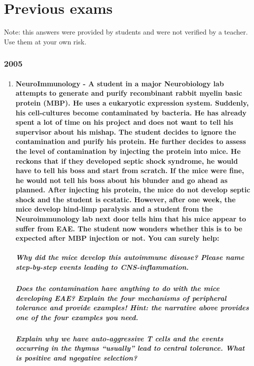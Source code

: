 \documentclass[12pt,article,oneside,a4paper]{memoir}
\begin{document}
\section{Previous exams}

Note: this answers were provided by students and were not verified by a teacher. Use them at your own risk.

\subsubsection{2005}
\begin{enumerate}
\item \paragraph{NeuroImmunology - A student in a major Neurobiology lab attempts to generate and purify recombinant rabbit myelin basic protein (MBP).  He uses a eukaryotic expression system.  Suddenly, his cell-cultures become contaminated by bacteria.  He has already spent a lot of time on his project and does not want to tell his supervisor about his mishap.  The student decides to ignore the contamination and purify his protein.  He further decides to assess the level of contamination by injecting the protein into mice.  He reckons that if they developed septic shock syndrome, he would have to tell his boss and start from scratch.  If the mice were fine, he would not tell his boss about his blunder and go ahead as planned. After injecting his protein, the mice do not develop septic shock and the student is ecstatic.  However, after one week, the mice develop hind-limp paralysis and a student from the Neuroimmunology lab next door tells him that his mice appear to suffer from EAE.  The student now wonders whether this is to be expected after MBP injection or not.  You can surely help:}
\subparagraph{Why did the mice develop this autoimmune disease?  Please name step-by-step events leading to CNS-inflammation.}
\subparagraph{Does the contamination have anything to do with the mice developing EAE?  Explain the four mechanisms of peripheral tolerance and provide examples!  Hint: the narrative above provides one of the four examples you need.}
\subparagraph{Explain why we have auto-aggressive T cells and the events occurring in the thymus “usually” lead to central tolerance.  What is positive and ngegative selection?}


\end{enumerate}
\end{document}
